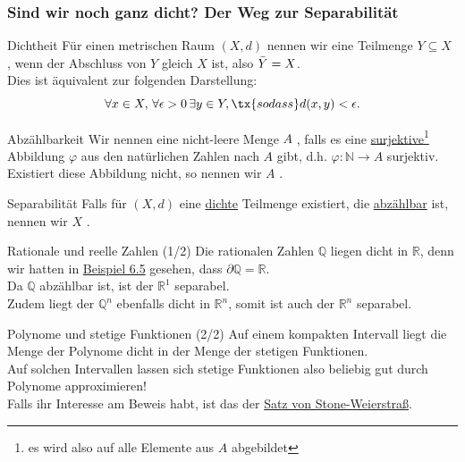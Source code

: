 \subsubsection{Sind wir noch ganz dicht? Der Weg zur Separabilität}
\begin{Def}
{Dichtheit}
Für einen metrischen Raum $(X,d)$ nennen wir eine Teilmenge $Y\subseteq X$ , wenn der Abschluss von $Y$ gleich $X$ ist, also $\Bar{Y}=X$.\\
Dies ist äquivalent zur folgenden Darstellung:
\begin{equation}
    \forall x\in X,\, \forall\epsilon>0\,\exists y\in Y,\tx{ sodass } d(x,y)<\epsilon.
\end{equation}
\end{Def}
\begin{Wiederholung}
{Abzählbarkeit}
Wir nennen eine nicht-leere Menge $A$ , falls es eine \underline{surjektive}\footnote{es wird also auf alle Elemente aus $A$ abgebildet} Abbildung $\varphi$ aus den natürlichen Zahlen nach $A$ gibt, d.h. $\varphi:\mathbb{N}\to A$ surjektiv.\\
Existiert diese Abbildung nicht, so nennen wir $A$ .
\end{Wiederholung}
\begin{Def}
{Separabilität}
Falls für $(X,d)$ eine \underline{dichte} Teilmenge existiert, die \underline{abzählbar} ist, nennen wir $X$ .
\end{Def}

\begin{Beispiel}
{Rationale und reelle Zahlen (1/2)}
Die rationalen Zahlen $\mathbb{Q}$ liegen dicht in $\mathbb{R}$, denn wir hatten in \hyperref[beisp:06RationaleUndReelleZahlenAbschluss]{Beispiel 6.5} gesehen, dass $\partial \mathbb{Q}=\mathbb{R}$.\\
Da $\mathbb{Q}$ abzählbar ist, ist der $\mathbb{R}^1$ separabel.\\
Zudem liegt der $\mathbb{Q}^n$ ebenfalls dicht in $\mathbb{R}^n$, somit ist auch der $\mathbb{R}^n$ separabel.
\end{Beispiel}

\begin{Beispiel}
{Polynome und stetige Funktionen (2/2)}
Auf einem kompakten Intervall liegt die Menge der Polynome dicht in der Menge der stetigen Funktionen.\\
Auf solchen Intervallen lassen sich stetige Funktionen also beliebig gut durch Polynome approximieren!\\
Falls ihr Interesse am Beweis habt, ist das der \href{https://de.wikipedia.org/wiki/Satz_von_Stone-Weierstra\%C3\%9F}{Satz von Stone-Weierstraß}.
\end{Beispiel}

